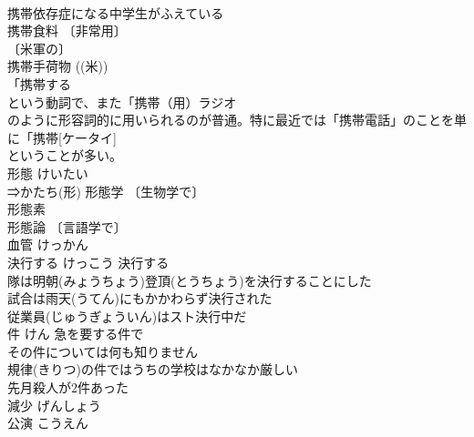 \documentclass[8pt]{extreport}
\begin{document}
\begin{CJK}{UTF8}{min}
\\	携帯依存症になる中学生がふえている 
\\	携帯食料 〔非常用〕
\\	〔米軍の〕
\\	携帯手荷物 ((米)) 
\\	[((英)) 
\\	〔機内持ち込みの〕
\\	[((英)) 
\\	携帯電話 
\\	[((口)) 
\\	携帯電話の電源を切る 
\\	プリペイド式携帯電話 
\\	携帯燃料 
\\	((米)) 
\\	((英)) 
\\	携帯品 
\\	((米)) 
\\	((英)) 
\\	携帯品預り所 ((米)) 
\\	((英)) 
\\	携帯用 
\\	携帯用ラジオ 
\\	携帯用の辞書 
\\	[参考]「携帯する 
\\	という動詞で、また「携帯（用）ラジオ 
\\	のように形容詞的に用いられるのが普通。特に最近では「携帯電話」のことを単に「携帯[ケータイ] 
\\	ということが多い。
\\	形態	けいたい	
\\	⇒かたち(形) 形態学 〔生物学で〕
\\	形態素 
\\	形態論 〔言語学で〕
\\	血管	けっかん	
\\	決行する	けっこう	決行する 
\\	隊は明朝(みょうちょう)登頂(とうちょう)を決行することにした 
\\	試合は雨天(うてん)にもかかわらず決行された 
\\	従業員(じゅうぎょういん)はスト決行中だ 
\\	件	けん	急を要する件で 
\\	その件については何も知りません 
\\	規律(きりつ)の件ではうちの学校はなかなか厳しい 
\\	先月殺人が2件あった 
\\	減少	げんしょう	
\\	公演	こうえん	

\end{CJK}
\end{document}
